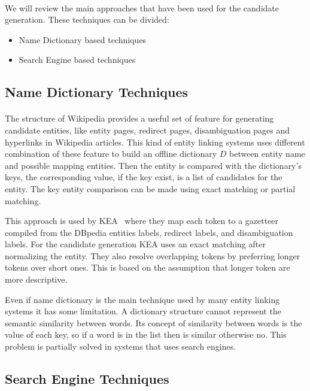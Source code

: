 \paragraph{}
We will review the main approaches that have been used for the candidate generation. These techniques can be divided:
\begin{itemize}[noitemsep,  topsep=10pt]
\item Name Dictionary based techniques
\item Search Engine based techniques
\end{itemize}

\subsection{Name Dictionary Techniques}
\paragraph{}
The structure of Wikipedia provides a useful set of feature for generating candidate entities, like entity pages, redirect pages, disambiguation pages and hyperlinks in Wikipedia articles. This kind of entity linking systems uses different combination of these feature to build an offline dictionary $D$ between entity name and possible mapping entities. Then the entity is compared with the dictionary's keys, the corresponding value, if the key exist, is a list of candidates for the entity. The key entity comparison can be made using exact matching or partial matching. 


This approach is used by KEA~\cite{waitelonisnamed} where they map each token to a gazetteer compiled from the DBpedia entities labels, redirect labels, and disambiguation labels. For the candidate generation KEA uses an exact matching  after normalizing the entity. They also resolve overlapping tokens by preferring longer tokens over short ones. This is based on the assumption that longer token are more descriptive.


Even if name dictionary is the main technique used by many entity linking systems it has some limitation. A dictionary structure cannot represent the semantic similarity between words. Its concept of similarity between words is the value of each key, so if a word is in the list then is similar otherwise no. This problem is partially solved in systems that uses search engines.

\subsection{Search Engine Techniques}

